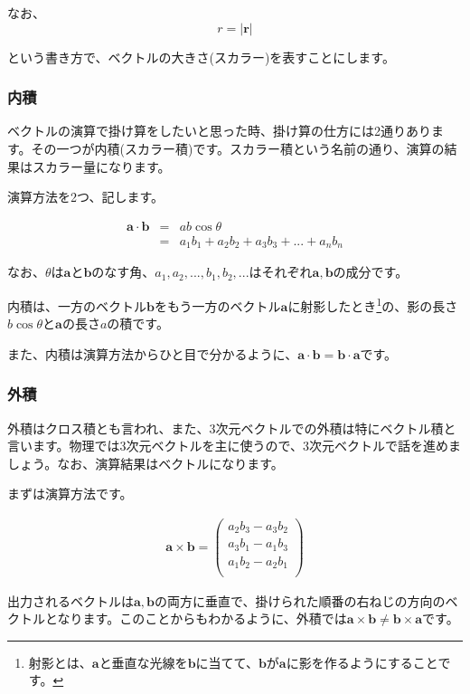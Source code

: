 なお、
\begin{equation}
    r = |\bm{r}|
\end{equation}

という書き方で、ベクトルの大きさ(スカラー)を表すことにします。



\subsubsection{内積}
ベクトルの演算で掛け算をしたいと思った時、掛け算の仕方には2通りあります。その一つが内積(スカラー積)です。スカラー積という名前の通り、演算の結果はスカラー量になります。

演算方法を2つ、記します。

\begin{eqnarray}
    \bm{a}\cdot\bm{b} &=& ab\cos\theta \\
    &=& a_1b_1+a_2b_2+a_3b_3+ ... + a_nb_n
\end{eqnarray}

なお、$\theta$は$\bm{a}$と$\bm{b}$のなす角、$a_1,a_2,...,b_1,b_2,...$はそれぞれ$\bm{a},\bm{b}$の成分です。

内積は、一方のベクトル$\bm{b}$をもう一方のベクトル$\bm{a}$に射影したとき\footnote{射影とは、$\bm{a}$と垂直な光線を$\bm{b}$に当てて、$\bm{b}$が$\bm{a}$に影を作るようにすることです。}の、影の長さ$b\cos\theta$と$\bm{a}$の長さ$a$の積です。

また、内積は演算方法からひと目で分かるように、$\bm{a}\cdot\bm{b}=\bm{b}\cdot\bm{a}$です。


\subsubsection{外積}
外積はクロス積とも言われ、また、3次元ベクトルでの外積は特にベクトル積と言います。物理では3次元ベクトルを主に使うので、3次元ベクトルで話を進めましょう。なお、演算結果はベクトルになります。

まずは演算方法です。

\begin{eqnarray}
    \bm{a}\times\bm{b}=
    \begin{pmatrix}
    a_2b_3-a_3b_2 \\
    a_3b_1-a_1b_3 \\
    a_1b_2-a_2b_1 \\
    \end{pmatrix}
\end{eqnarray}

出力されるベクトルは$\bm{a},\bm{b}$の両方に垂直で、掛けられた順番の右ねじの方向のベクトルとなります。このことからもわかるように、外積では$\bm{a}\times\bm{b}\neq\bm{b}\times\bm{a}$です。




